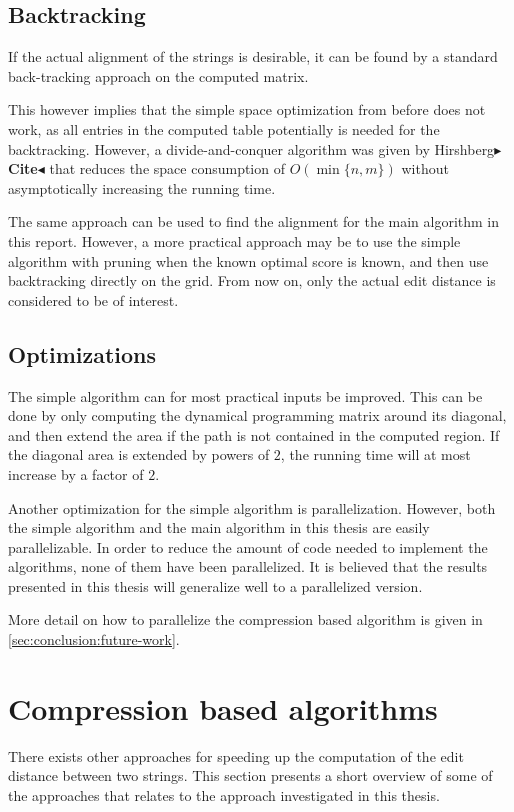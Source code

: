 \documentclass[twoside,11pt,openright]{report}
\newcommand{\todo}[1]{{\color[rgb]{.5,0,0}\textbf{$\blacktriangleright$#1$\blacktriangleleft$}}}
\begin{document}
\subsection{Backtracking}
If the actual alignment of the strings is desirable, it can be found by a standard back-tracking approach on the computed matrix.

This however implies that the simple space optimization from before does not work, as all entries in the computed table potentially is needed for the backtracking. However, a divide-and-conquer algorithm was given by Hirshberg\todo{Cite} that reduces the space consumption of $O(\min\{n, m\})$ without asymptotically increasing the running time.

The same approach can be used to find the alignment for the main algorithm in this report. However, a more practical approach may be to use the simple algorithm with pruning when the known optimal score is known, and then use backtracking directly on the grid. From now on, only the actual edit distance is considered to be of interest.

\subsection{Optimizations}
The simple algorithm can for most practical inputs be improved. This can be done by only computing the dynamical programming matrix around its diagonal, and then extend the area if the path is not contained in the computed region. If the diagonal area is extended by powers of $2$, the running time will at most increase by a factor of $2$.

Another optimization for the simple algorithm is parallelization. However, both the simple algorithm and the main algorithm in this thesis \cite{Gawrychowski:2012:FAC:2422024.2422048} are easily parallelizable. In order to reduce the amount of code needed to implement the algorithms, none of them have been parallelized. It is believed that the results presented in this thesis will generalize well to a parallelized version.

More detail on how to parallelize the compression based algorithm is given in \cref{sec:conclusion:future-work}.

\section{Compression based algorithms}
There exists other approaches for speeding up the computation of the edit distance between two strings. This section presents a short overview of some of the approaches that relates to the approach investigated in this thesis.
\end{document}
